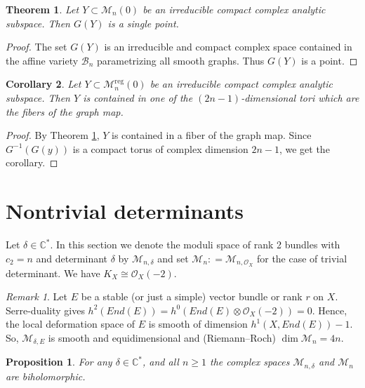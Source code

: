 \documentclass[
  a4paper, 
  reqno, 
  oneside, 
  11pt
]{amsart}
\theoremstyle{plain}	%
\newtheorem{theorem}{Theorem} %
\newtheorem{corollary}[theorem]{Corollary}
\newtheorem{proposition}{Proposition}
\theoremstyle{mydef} %
\theoremstyle{remark}
\newtheorem{remark}{Remark}
\theoremstyle{definition}
\theoremstyle{remark}
\DeclareMathOperator{\reg}{reg}
\newcommand{\ce}{\mathrel{\mathop:}=}
\begin{document}
\begin{theorem}\label{ttt1}
Let $Y\subset \mathcal M_n(0)$ be an irreducible compact complex analytic subspace. Then $G(Y)$ is a single point.
\end{theorem}

\begin{proof}
The set $G(Y)$ is an irreducible and compact complex space contained in the affine variety $\mathcal B_n$
 parametrizing all smooth graphs. Thus $G(Y)$ is a point.
\end{proof}

\begin{corollary}\label{ttt2}
Let $Y\subset \mathcal M_n^{\reg}(0)$ be an irreducible compact complex analytic subspace. Then $Y$ is contained in one of the $(2n-1)$-dimensional tori
which are the fibers of the graph map.
\end{corollary}

\begin{proof}
By Theorem \ref{ttt1}, $Y$ is contained in a fiber of the graph map. Since $G^{-1}(G(y))$ is a compact torus of complex dimension $2n-1$, we get the corollary.
\end{proof}




\section{Nontrivial determinants}
Let $\delta \in \mathbb C^*$. In this section we denote the moduli space of rank 2 bundles with $c_2=n$ 
and determinant $\delta$ by $\mathcal M_{n,\delta}$ and set  $\mathcal M_n \ce \mathcal M_{n, \mathcal O_X}$
for the case of trivial determinant.  We have $K_X\cong \mathcal O_X(-2)$.

\begin{remark}\label{wpre1} Let $E$ be a stable (or just a simple) vector bundle or rank $r$ on $X$. Serre-duality gives $h^2(End(E)) =h^0(End(E)\otimes \mathcal O_X(-2)) =0$.
Hence, the local deformation space of $E$ is smooth of dimension $h^1(X,End(E))-1$. 
So, $\mathcal M_{\delta,E}$ is smooth and equidimensional and (Riemann--Roch) $\dim \mathcal M_n=4n$.
\end{remark}

\begin{proposition}\label{wpre2}
For any $\delta \in \mathbb C^*$, and all $n\ge 1$ the complex spaces $\mathcal M_{n,\delta}$ and $\mathcal M_n$ are biholomorphic.
\end{proposition}
\end{document}
